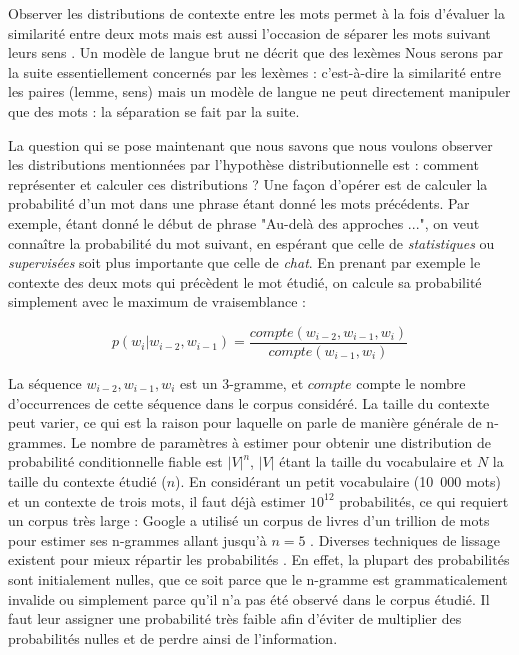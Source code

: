 Observer les distributions de contexte entre les mots permet à la fois
d'évaluer la similarité entre deux mots mais est aussi l'occasion de séparer
les mots suivant leurs sens \citep{yarowsky1993one,pantel2002discovering}. Un
modèle de langue brut ne décrit que des lexèmes Nous serons par la suite
essentiellement concernés par les lexèmes : c'est-à-dire la similarité entre
les paires (lemme, sens) mais un modèle de langue ne peut directement manipuler
que des mots : la séparation se fait par la suite.


La question qui se pose maintenant que nous savons que nous voulons observer
les distributions mentionnées par l'hypothèse distributionnelle est : comment
représenter et calculer ces distributions ? Une façon d'opérer est de calculer
la probabilité d'un mot dans une phrase étant donné les mots précédents. Par
exemple, étant donné le début de phrase "Au-delà des approches ...", on veut
connaître la probabilité du mot suivant, en espérant que celle de
\emph{statistiques} ou \emph{supervisées} soit plus importante que celle de
\emph{chat}. En prenant par exemple le contexte des deux mots qui précèdent le
mot étudié, on calcule sa probabilité simplement avec le maximum de
vraisemblance :

\[
p(w_i|w_{i-2}, w_{i-1}) = \frac{compte(w_{i-2}, w_{i-1}, w_i)}{compte(w_{i-1}, w_i)}
\]

La séquence $w_{i-2}, w_{i-1}, w_{i}$ est un 3-gramme, et $compte$ compte le
nombre d'occurrences de cette séquence dans le corpus considéré. La taille du
contexte peut varier, ce qui est la raison pour laquelle on parle de manière
générale de n-grammes. Le nombre de paramètres à estimer pour obtenir une
distribution de probabilité conditionnelle fiable est $|V|^n$, $|V|$ étant la
taille du vocabulaire et $N$ la taille du contexte étudié ($n$). En considérant
un petit vocabulaire (10~000 mots) et un contexte de trois mots, il faut déjà
estimer $10^{12}$ probabilités, ce qui requiert un corpus très large : Google a
utilisé un corpus de livres d'un trillion de mots pour estimer ses n-grammes
allant jusqu'à $n=5$ \citep{brants2006web}. Diverses techniques de lissage
existent pour mieux répartir les probabilités
\citep[Chapitre~4]{jurafsky2008speech}. En effet, la plupart des probabilités
sont initialement nulles, que ce soit parce que le n-gramme est
grammaticalement invalide ou simplement parce qu'il n'a pas été observé dans le
corpus étudié. Il faut leur assigner une probabilité très faible afin d'éviter
de multiplier des probabilités nulles et de perdre ainsi de l'information.

